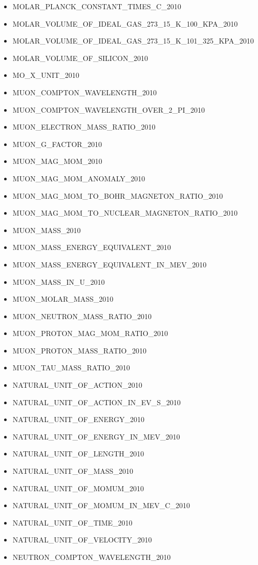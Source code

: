 \begin{itemize}
\item MOLAR\_PLANCK\_CONSTANT\_TIMES\_C\_2010
\item MOLAR\_VOLUME\_OF\_IDEAL\_GAS\_273\_15\_K\_100\_KPA\_2010
\item MOLAR\_VOLUME\_OF\_IDEAL\_GAS\_273\_15\_K\_101\_325\_KPA\_2010
\item MOLAR\_VOLUME\_OF\_SILICON\_2010
\item MO\_X\_UNIT\_2010
\item MUON\_COMPTON\_WAVELENGTH\_2010
\item MUON\_COMPTON\_WAVELENGTH\_OVER\_2\_PI\_2010
\item MUON\_ELECTRON\_MASS\_RATIO\_2010
\item MUON\_G\_FACTOR\_2010
\item MUON\_MAG\_MOM\_2010
\item MUON\_MAG\_MOM\_ANOMALY\_2010
\item MUON\_MAG\_MOM\_TO\_BOHR\_MAGNETON\_RATIO\_2010
\item MUON\_MAG\_MOM\_TO\_NUCLEAR\_MAGNETON\_RATIO\_2010
\item MUON\_MASS\_2010
\item MUON\_MASS\_ENERGY\_EQUIVALENT\_2010
\item MUON\_MASS\_ENERGY\_EQUIVALENT\_IN\_MEV\_2010
\item MUON\_MASS\_IN\_U\_2010
\item MUON\_MOLAR\_MASS\_2010
\item MUON\_NEUTRON\_MASS\_RATIO\_2010
\item MUON\_PROTON\_MAG\_MOM\_RATIO\_2010
\item MUON\_PROTON\_MASS\_RATIO\_2010
\item MUON\_TAU\_MASS\_RATIO\_2010
\item NATURAL\_UNIT\_OF\_ACTION\_2010
\item NATURAL\_UNIT\_OF\_ACTION\_IN\_EV\_S\_2010
\item NATURAL\_UNIT\_OF\_ENERGY\_2010
\item NATURAL\_UNIT\_OF\_ENERGY\_IN\_MEV\_2010
\item NATURAL\_UNIT\_OF\_LENGTH\_2010
\item NATURAL\_UNIT\_OF\_MASS\_2010
\item NATURAL\_UNIT\_OF\_MOMUM\_2010
\item NATURAL\_UNIT\_OF\_MOMUM\_IN\_MEV\_C\_2010
\item NATURAL\_UNIT\_OF\_TIME\_2010
\item NATURAL\_UNIT\_OF\_VELOCITY\_2010
\item NEUTRON\_COMPTON\_WAVELENGTH\_2010

\end{itemize}
